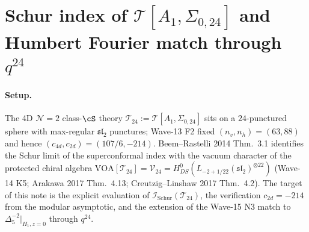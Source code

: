 
\providecommand{\ClaimStatusTheorem}{[Theorem]}
\providecommand{\ClaimStatusConjectured}{[Conjectured]}
\providecommand{\ClaimStatusHeuristic}{[Heuristic]}
\providecommand{\IS}{\mathcal{I}_{\mathrm{Schur}}}
\providecommand{\cT}{\mathcal{T}}
\providecommand{\cV}{\mathcal{V}}
\providecommand{\cN}{\mathcal{N}}
\providecommand{\Sig}{\Sigma}
\providecommand{\sltwo}{\mathfrak{sl}_2}
\providecommand{\DS}{H^{0}_{DS}}
\providecommand{\kBKM}{\kappa_{\mathrm{BKM}}}
\providecommand{\kch}{\kappa_{\mathrm{ch}}}
\providecommand{\kcat}{\kappa_{\mathrm{cat}}}
\providecommand{\Z}{\mathbb{Z}}
\providecommand{\C}{\mathbb{C}}
\providecommand{\Q}{\mathbb{Q}}
\providecommand{\Sp}{\mathrm{Sp}}
\providecommand{\Ha}{\mathcal{H}}

\section{Schur index of $\cT[A_1, \Sig_{0,24}]$ and Humbert Fourier match through $q^{24}$}
\label{wn:sec:wave16-t2-Sigma024-Schur-index}

\paragraph{Setup.} The 4D $\cN{=}2$ class-$\cS$ theory
$\cT_{24} := \cT[A_1, \Sig_{0,24}]$ sits on a $24$-punctured sphere with
max-regular $\sltwo$ punctures; Wave-13 F2 fixed $(n_v, n_h) = (63, 88)$
and hence $(c_{4d}, c_{2d}) = (107/6, -214)$. Beem--Rastelli 2014
Thm.~3.1 identifies the Schur limit of the superconformal index with the
vacuum character of the protected chiral algebra
$\mathrm{VOA}[\cT_{24}] = \cV_{24} = \DS(L_{-2+1/22}(\sltwo)^{\otimes 22})$
(Wave-14 K5; Arakawa 2017 Thm.~4.13; Creutzig--Linshaw 2017 Thm.~4.2).
The target of this note is the explicit evaluation of $\IS(\cT_{24})$,
the verification $c_{2d} = -214$ from the modular asymptotic, and the
extension of the Wave-15 N3 match to $\Delta_5^{-2}|_{H_1, z=0}$ through
$q^{24}$.

